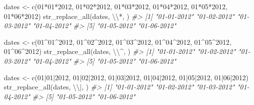 \documentclass[
]{book}
\newenvironment{Shaded}{\begin{snugshade}}{\end{snugshade}}
\newcommand{\CommentTok}[1]{\textcolor[rgb]{0.56,0.35,0.01}{\textit{#1}}}
\newcommand{\FunctionTok}[1]{\textcolor[rgb]{0.00,0.00,0.00}{#1}}
\newcommand{\NormalTok}[1]{#1}
\newcommand{\OtherTok}[1]{\textcolor[rgb]{0.56,0.35,0.01}{#1}}
\newcommand{\SpecialCharTok}[1]{\textcolor[rgb]{0.00,0.00,0.00}{#1}}
\newcommand{\StringTok}[1]{\textcolor[rgb]{0.31,0.60,0.02}{#1}}
\begin{document}
\begin{Shaded}
\begin{Highlighting}[]
\NormalTok{dates }\OtherTok{\textless{}{-}} \FunctionTok{c}\NormalTok{(}\StringTok{\textquotesingle{}01*01*2012\textquotesingle{}}\NormalTok{, }\StringTok{\textquotesingle{}01*02*2012\textquotesingle{}}\NormalTok{, }\StringTok{\textquotesingle{}01*03*2012\textquotesingle{}}\NormalTok{, }\StringTok{\textquotesingle{}01*04*2012\textquotesingle{}}\NormalTok{, }\StringTok{\textquotesingle{}01*05*2012\textquotesingle{}}\NormalTok{, }\StringTok{\textquotesingle{}01*06*2012\textquotesingle{}}\NormalTok{)}
\FunctionTok{str\_replace\_all}\NormalTok{(dates, }\StringTok{\textquotesingle{}}\SpecialCharTok{\textbackslash{}\textbackslash{}}\StringTok{*\textquotesingle{}}\NormalTok{, }\StringTok{\textquotesingle{}{-}\textquotesingle{}}\NormalTok{)}
\CommentTok{\#\textgreater{} [1] "01{-}01{-}2012" "01{-}02{-}2012" "01{-}03{-}2012" "01{-}04{-}2012"}
\CommentTok{\#\textgreater{} [5] "01{-}05{-}2012" "01{-}06{-}2012"}

\NormalTok{dates }\OtherTok{\textless{}{-}} \FunctionTok{c}\NormalTok{(}\StringTok{\textquotesingle{}01\^{}01\^{}2012\textquotesingle{}}\NormalTok{, }\StringTok{\textquotesingle{}01\^{}02\^{}2012\textquotesingle{}}\NormalTok{, }\StringTok{\textquotesingle{}01\^{}03\^{}2012\textquotesingle{}}\NormalTok{, }\StringTok{\textquotesingle{}01\^{}04\^{}2012\textquotesingle{}}\NormalTok{, }\StringTok{\textquotesingle{}01\^{}05\^{}2012\textquotesingle{}}\NormalTok{, }\StringTok{\textquotesingle{}01\^{}06\^{}2012\textquotesingle{}}\NormalTok{)}
\FunctionTok{str\_replace\_all}\NormalTok{(dates, }\StringTok{\textquotesingle{}}\SpecialCharTok{\textbackslash{}\textbackslash{}}\StringTok{\^{}\textquotesingle{}}\NormalTok{, }\StringTok{\textquotesingle{}{-}\textquotesingle{}}\NormalTok{)}
\CommentTok{\#\textgreater{} [1] "01{-}01{-}2012" "01{-}02{-}2012" "01{-}03{-}2012" "01{-}04{-}2012"}
\CommentTok{\#\textgreater{} [5] "01{-}05{-}2012" "01{-}06{-}2012"}

\NormalTok{dates }\OtherTok{\textless{}{-}} \FunctionTok{c}\NormalTok{(}\StringTok{\textquotesingle{}01|01|2012\textquotesingle{}}\NormalTok{, }\StringTok{\textquotesingle{}01|02|2012\textquotesingle{}}\NormalTok{, }\StringTok{\textquotesingle{}01|03|2012\textquotesingle{}}\NormalTok{, }\StringTok{\textquotesingle{}01|04|2012\textquotesingle{}}\NormalTok{, }\StringTok{\textquotesingle{}01|05|2012\textquotesingle{}}\NormalTok{, }\StringTok{\textquotesingle{}01|06|2012\textquotesingle{}}\NormalTok{)}
\FunctionTok{str\_replace\_all}\NormalTok{(dates, }\StringTok{\textquotesingle{}}\SpecialCharTok{\textbackslash{}\textbackslash{}}\StringTok{|\textquotesingle{}}\NormalTok{, }\StringTok{\textquotesingle{}{-}\textquotesingle{}}\NormalTok{)}
\CommentTok{\#\textgreater{} [1] "01{-}01{-}2012" "01{-}02{-}2012" "01{-}03{-}2012" "01{-}04{-}2012"}
\CommentTok{\#\textgreater{} [5] "01{-}05{-}2012" "01{-}06{-}2012"}


\end{Highlighting}
\end{Shaded}
\end{document}
